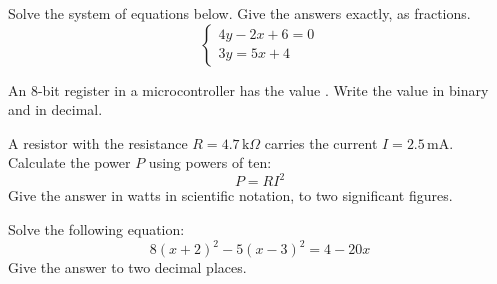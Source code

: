 Solve the system of equations below. Give the answers exactly, as fractions.
\[
  \begin{cases}
    4y - 2x + 6 = 0 \\
    3y = 5x + 4
  \end{cases}
\]

An 8-bit register in a microcontroller has the value . Write the value in binary and in
decimal.

A resistor with the resistance $R = 4.7\,\text{k}\Omega$ carries the current
$I = 2.5\,\text{mA}$. Calculate the power $P$ using powers of ten:
\[
  P = RI^2
\]
Give the answer in watts in scientific notation, to two significant figures.

Solve the following equation:
\[
  8(x + 2)^2 - 5(x - 3)^2 = 4 - 20x
\]
Give the answer to two decimal places.
